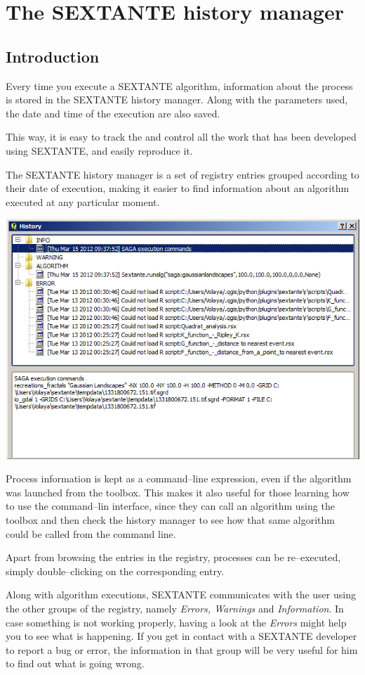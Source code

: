 \chapter{The SEXTANTE history manager}

\section {Introduction}

Every time you execute a SEXTANTE algorithm, information about the process is stored in the SEXTANTE history manager. Along with the parameters used, the date and time of the execution are also saved.

This way, it is easy to track the and control all the work that has been developed using SEXTANTE, and easily reproduce it.

The SEXTANTE history manager is a set of registry entries grouped according to their date of execution, making it easier to find information about an algorithm executed at any particular moment.

\begin{center}
\includegraphics[width=.7\columnwidth]{history.png}
\end{center}

Process information is kept as a command--line expression, even if the algorithm was launched from the toolbox. This makes it also useful for those learning how to use the command--lin interface, since they can call an algorithm using the toolbox and then check the history manager to see how that same algorithm could be called from the command line.

Apart from browsing the entries in the registry, processes can be re--executed, simply double--clicking on the corresponding entry.

Along with algorithm executions, SEXTANTE communicates with the user using the other groups of the registry, namely \emph{Errors, Warnings} and \emph{Information}. In case something is not working properly, having a look at the \emph{Errors} might help you to see what is happening. If you get in contact with a SEXTANTE developer to report a bug or error, the information in that group will be very useful for him to find out what is going wrong.

